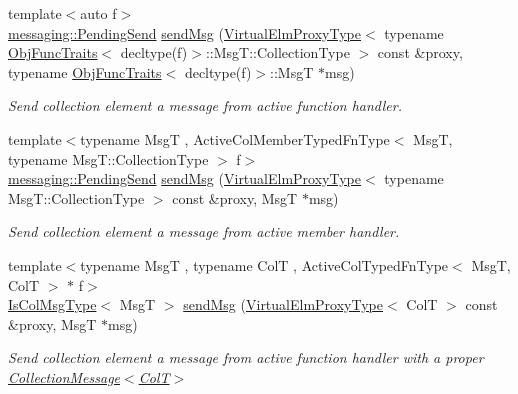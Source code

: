 \begin{DoxyCompactItemize}
{\footnotesize template$<$auto f$>$ }\\\hyperlink{structvt_1_1messaging_1_1_pending_send}{messaging\+::\+Pending\+Send} \hyperlink{structvt_1_1vrt_1_1collection_1_1_collection_manager_a268a9567ecef23da076ad7bf9bec2e3f}{send\+Msg} (\hyperlink{namespacevt_1_1vrt_a620a5c8c59d13e513f690c74b4af516f}{Virtual\+Elm\+Proxy\+Type}$<$ typename \hyperlink{structvt_1_1_obj_func_traits}{Obj\+Func\+Traits}$<$ decltype(f)$>$\+::Msg\+T\+::\+Collection\+Type $>$ const \&proxy, typename \hyperlink{structvt_1_1_obj_func_traits}{Obj\+Func\+Traits}$<$ decltype(f)$>$\+::MsgT $\ast$msg)
\begin{DoxyCompactList}\small\item\em Send collection element a message from active function handler. \end{DoxyCompactList}\item 
{\footnotesize template$<$typename MsgT , Active\+Col\+Member\+Typed\+Fn\+Type$<$ Msg\+T, typename Msg\+T\+::\+Collection\+Type $>$ f$>$ }\\\hyperlink{structvt_1_1messaging_1_1_pending_send}{messaging\+::\+Pending\+Send} \hyperlink{structvt_1_1vrt_1_1collection_1_1_collection_manager_a3165b258fab15c35985b3f9b8ef0dbe7}{send\+Msg} (\hyperlink{namespacevt_1_1vrt_a620a5c8c59d13e513f690c74b4af516f}{Virtual\+Elm\+Proxy\+Type}$<$ typename Msg\+T\+::\+Collection\+Type $>$ const \&proxy, MsgT $\ast$msg)
\begin{DoxyCompactList}\small\item\em Send collection element a message from active member handler. \end{DoxyCompactList}\item 
{\footnotesize template$<$typename MsgT , typename ColT , Active\+Col\+Typed\+Fn\+Type$<$ Msg\+T, Col\+T $>$ $\ast$ f$>$ }\\\hyperlink{structvt_1_1vrt_1_1collection_1_1_collection_manager_a21c21612c806016788057aeab142af20}{Is\+Col\+Msg\+Type}$<$ MsgT $>$ \hyperlink{structvt_1_1vrt_1_1collection_1_1_collection_manager_a55777b57bfad6c9d87d946ed773a391d}{send\+Msg} (\hyperlink{namespacevt_1_1vrt_a620a5c8c59d13e513f690c74b4af516f}{Virtual\+Elm\+Proxy\+Type}$<$ ColT $>$ const \&proxy, MsgT $\ast$msg)
\begin{DoxyCompactList}\small\item\em Send collection element a message from active function handler with a proper {\ttfamily \hyperlink{structvt_1_1vrt_1_1collection_1_1_collection_message}{Collection\+Message$<$\+Col\+T$>$}} \end{DoxyCompactList}\item 

\end{DoxyCompactItemize}
